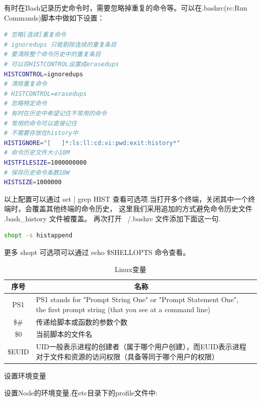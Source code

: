 \documentclass[12pt]{book}
\makeatletter
\numberwithin{dummy}{section}
\theoremstyle{ocrenumbox}
\theoremstyle{blacknumex}
\theoremstyle{blacknumbox}
\theoremstyle{ocrenum}
\renewcommand{\subsubsection}{\@startsection {subsubsection}{3}{\z@}
	{-2ex \@plus -0.1ex \@minus -.2ex}
	{.2ex \@plus.2ex }
	{\normalfont\small\sffamily\bfseries}}
\makeatother
\begin{document}
有时在Bash记录历史命令时，需要忽略掉重复的命令等。可以在.bashrc(rc:Run Commands)脚本中做如下设置：

\begin{lstlisting}[language=Bash]
# 忽略[连续]重复命令
# ignoredups 只能剔除连续的重复条目
# 要清除整个命令历史中的重复条目
# 可以将HISTCONTROL设置成erasedups
HISTCONTROL=ignoredups
# 清除重复命令
# HISTCONTROL=erasedups
# 忽略特定命令
# 有时在历史中希望记住不常用的命令
# 常用的命令可以直接记住
# 不需要存放在history中
HISTIGNORE="[   ]*:ls:ll:cd:vi:pwd:exit:history*"
# 命令历史文件大小10M
HISTFILESIZE=1000000000
# 保存历史命令条数10W
HISTSIZE=1000000
\end{lstlisting}

以上配置可以通过 set | grep HIST 查看可选项.当打开多个终端，关闭其中一个终端时，会覆盖其他终端的命令历史， 这里我们采用追加的方式避免命令历史文件 .bash\_history 文件被覆盖。 再次打开 ~/.bashrc 文件添加下面这一句.

\begin{lstlisting}[language=Bash]
shopt -s histappend
\end{lstlisting}

更多 shopt 可选项可以通过 echo \$SHELLOPTS 命令查看。

\begin{table}
	\caption{Linux变量}
	\label{table:linuxenvironmentvariable}
	\begin{center}
	\begin{tabular}{cp{10cm}c}
		\hline
		\multirow{1}{*}{序号}
		& \multicolumn{1}{c}{名称}  \\
		\hline			
		PS1  & PS1 stands for "Prompt String One" or "Prompt Statement One", the first prompt string (that you see at a command line) \\
		\$\# & 传递给脚本或函数的参数个数 \\
		\$0 & 当前脚本的文件名 \\
		\$EUID & UID一般表示进程的创建者（属于哪个用户创建），而EUID表示进程对于文件和资源的访问权限（具备等同于哪个用户的权限） \\
		\hline
	\end{tabular}	
	\end{center}
\end{table}

\subsubsection{设置环境变量}

设置Node的环境变量,在etc目录下的profile文件中:
\end{document}
